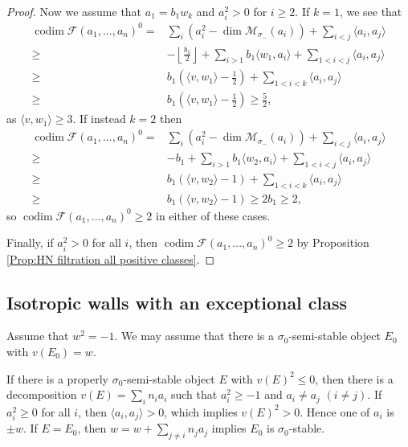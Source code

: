 \documentclass[leqno,11pt]{amsart}
\def\codim{\mathop{\mathrm{codim}}\nolimits}
\def\dim{\mathop{\mathrm{dim}}\nolimits}
\theoremstyle{definition}
\def\FF{\ensuremath{\mathcal F}}
\def\MM{\ensuremath{\mathcal M}}
\begin{document}
\begin{proof}
Now we assume that $a_1=b_1 w_k$ and $a_i^2>0$ for $i \geq 2$.
If $k=1$, we see that
\begin{equation}
\begin{split}
\codim\FF(a_1,...,a_n)^0=&\sum_i (a_i^2-\dim \MM_{\sigma_-}(a_i))+\sum_{i<j}\langle a_i,a_j \rangle\\
\geq&-\left\lfloor\frac{b_1}{2}\right\rfloor+\sum_{i>1}b_1\langle w_1,a_i\rangle+\sum_{1<i<j}\langle a_i,a_j\rangle\\
\geq&b_1(\langle v,w_1\rangle-\frac{1}{2})+\sum_{1<i<k}\langle a_i,a_j\rangle\\
\geq&b_1(\langle v,w_1\rangle-\frac{1}{2})\geq \frac{5}{2},
\end{split}
\end{equation}
as $\langle v,w_1\rangle\geq 3$.  If instead $k=2$ then 
\begin{equation}
\begin{split}
\codim\FF(a_1,...,a_n)^0=&\sum_i (a_i^2-\dim \MM_{\sigma_-}(a_i))+\sum_{i<j}\langle a_i,a_j \rangle\\
\geq&-b_1+\sum_{i>1}b_1\langle w_2,a_i\rangle+\sum_{1<i<j}\langle a_i,a_j\rangle\\
\geq&b_1(\langle v,w_2\rangle-1)+\sum_{1<i<k}\langle a_i,a_j\rangle\\
\geq&b_1(\langle v,w_2\rangle-1)\geq 2b_1\geq 2,
\end{split}
\end{equation}
so $\codim \FF(a_1,...,a_n)^0\geq 2$ in either of these cases.

Finally, if $a_i^2>0$ for all $i$, then $\codim\FF(a_1,...,a_n)^0\geq 2$ by Proposition \ref{Prop:HN filtration all positive classes}.
\end{proof}


\subsection{Isotropic walls with an exceptional class}



Assume that $w^2=-1$.
We may assume that there is a $\sigma_0$-semi-stable object $E_0$
with $v(E_0)=w$.

If there is a properly $\sigma_0$-semi-stable object $E$ with $v(E)^2 \leq 0$,
then there is a decomposition $v(E)=\sum_i n_i a_i$ such that  
$a_i^2 \geq -1$ and $a_i \ne a_j$ $(i \ne j)$.
If $a_i^2 \geq 0$ for all $i$, then $\langle a_i,a_j \rangle>0$, which implies
$v(E)^2>0$. Hence one of $a_i$ is $\pm w$.
If $E=E_0$, then $w=w+\sum_{j \ne i} n_j a_j$ implies $E_0$ is 
$\sigma_0$-stable.
\end{document}

